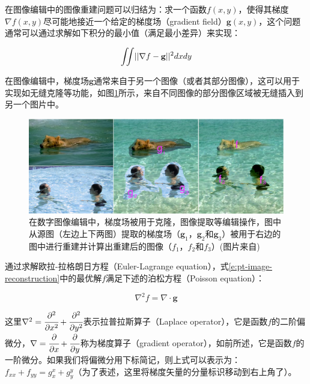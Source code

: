 \noindent 在图像编辑中的图像重建问题可以归结为：求一个函数$f(x,y)$，使得其梯度$\nabla f(x,y)$尽可能地接近一个给定的梯度场（gradient field）$\mathbf{g}(x,y)$，这个问题通常可以通过求解如下积分的最小值（满足最小差异）来实现：

\begin{equation}\label{e:pt-image-reconstruction}
	{\rm \iint} ||\nabla f-\mathbf{g}||^{2}dxdy
\end{equation}

\noindent 在图像编辑中，梯度场$\mathbf{g}$通常来自于另一个图像（或者其部分图像），这可以用于实现如无缝克隆等功能，如图\ref{f:pt-image-reconstruction}所示，来自不同图像的部分图像区域被无缝插入到另一个图片中。

\begin{figure}
\begin{fullwidth}
	\includegraphics[width=1.0\thewidth]{figures/pt/image-reconstruction}
	\caption{在数字图像编辑中，梯度场被用于克隆，图像提取等编辑操作，图中从源图（左边上下两图）提取的梯度场（$\mathbf{g}_1$，$\mathbf{g}_2$和$\mathbf{g}_3$）被用于右边的图中进行重建并计算出重建后的图像（$f_1$，$f_2$和$f_3$）(图片来自\cite{a:PoissonImageEditing})}
	\label{f:pt-image-reconstruction}
\end{fullwidth}
\end{figure}

通过求解欧拉-拉格朗日方程（Euler-Lagrange equation），式\ref{e:pt-image-reconstruction}中的最优解$f$满足下述的泊松方程（Poisson equation）：

\begin{equation}
	\nabla^{2}f=\nabla\cdot\mathbf{g}
\end{equation}

\noindent 这里$\nabla^{2}= \cfrac{{\rm \partial}^{2}}{{\rm \partial} x^{2}}+ \cfrac{{\rm \partial}^{2}}{{\rm \partial} y^{2}}$表示拉普拉斯算子（Laplace operator），它是函数$f$的二阶偏微分，$\nabla= \cfrac{{\rm \partial}}{{\rm \partial} x}+ \cfrac{{\rm \partial}}{{\rm \partial} y}$称为梯度算子（gradient operator），如前所述，它是函数$f$的一阶微分。如果我们将偏微分用下标简记，则上式可以表示为：$f_{xx}+f_{yy}=g^{x}_x+g^{y}_y$（为了表述，这里将梯度矢量的分量标识移动到右上角了）。

